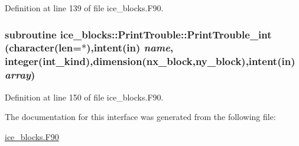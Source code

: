 Definition at line 139 of file ice\_\-blocks.F90.\hypertarget{interfaceice__blocks_1_1PrintTrouble_af276702896f3c2a7db4981f82739bf1f}{
\subsubsection[{PrintTrouble\_\-int}]{\setlength{\rightskip}{0pt plus 5cm}subroutine ice\_\-blocks::PrintTrouble::PrintTrouble\_\-int (character(len=$\ast$),intent(in) {\em name}, \/  integer(int\_\-kind),dimension({\bf nx\_\-block},{\bf ny\_\-block}),intent(in) {\em array})}}
\label{interfaceice__blocks_1_1PrintTrouble_af276702896f3c2a7db4981f82739bf1f}


Definition at line 150 of file ice\_\-blocks.F90.

The documentation for this interface was generated from the following file:\begin{DoxyCompactItemize}
\item 
\hyperlink{ice__blocks_8F90}{ice\_\-blocks.F90}\end{DoxyCompactItemize}
